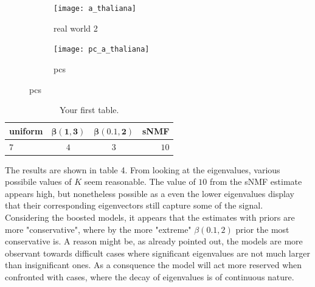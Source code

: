 \documentclass[a4paper, 11pt]{article}
\begin{document}
\begin{figure}
\centering
\begin{subfigure}
\centering
\texttt{[image: a\_thaliana]}
\caption{real world 2}
\end{subfigure}
\begin{subfigure}
\centering
\texttt{[image: pc\_a\_thaliana]}
\caption{pcs}
\end{subfigure}
\end{figure}



\begin{table}[h!]
  \begin{center}
    \label{tab:table3}
    \begin{tabular}{l|c|c|r} %
      \textbf{uniform} & $\mathbf{\beta(1, 3)}$ & $\mathbf{\beta(0.1,2)}$  & \textbf{sNMF}\\
      \hline
      $7$ & $4$ & $3$ & $10$\\
    \end{tabular}
    \caption{Your first table.}
  \end{center}
\end{table}

The results are shown in table 4. From looking at the eigenvalues, various possibile values of $K$ seem reasonable. The value of $10$ from the sNMF estimate appears high, but nonetheless possible as a even the lower eigenvalues display that their corresponding eigenvectors still capture some of the signal. \\
Considering the boosted models, it appears that the estimates with priors are more "conservative", where by the more "extreme" $\beta(0.1,2)$ prior the most conservative is. A reason might be, as already pointed out, the models are more observant towards difficult cases where significant eigenvalues are not much larger than insignificant ones. As a consquence the model will act more reserved when confronted with cases, where the decay of eigenvalues is of continuous nature.
\end{document}
